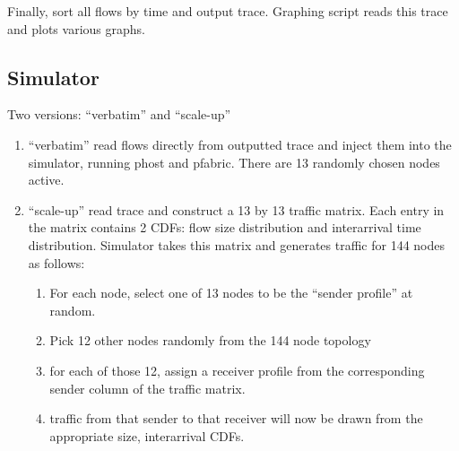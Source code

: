 Finally, sort all flows by time and output trace.
Graphing script reads this trace and plots various graphs.

\subsection{Simulator}
Two versions: ``verbatim'' and ``scale-up''
\begin{enumerate}
\item ``verbatim'' read flows directly from outputted trace and inject them into the simulator, running phost and pfabric. There are 13 randomly chosen nodes active.
\item ``scale-up'' read trace and construct a 13 by 13 traffic matrix. Each entry in the matrix contains 2 CDFs: flow size distribution and interarrival time distribution. Simulator takes this matrix and generates traffic for 144 nodes as follows:
    \begin{enumerate}
    \item For each node, select one of 13 nodes to be the ``sender profile'' at random.
    \item Pick 12 other nodes randomly from the 144 node topology
    \item for each of those 12, assign a receiver profile from the corresponding sender column of the traffic matrix.
    \item traffic from that sender to that receiver will now be drawn from the appropriate size, interarrival CDFs.
    \end{enumerate}
\end{enumerate}